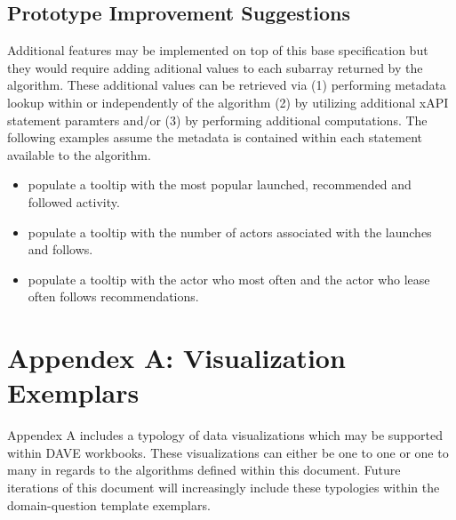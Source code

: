 \documentclass{article}
\begin{document}
\subsection{Prototype Improvement Suggestions}
Additional features may be implemented on top of this base
specification but they would require adding aditional values to each
subarray returned by the algorithm. These additional values can be
retrieved via (1) performing metadata lookup within or independently
of the algorithm (2) by utilizing additional xAPI statement paramters
and/or (3) by performing additional computations. The following
examples assume the metadata is contained within each statement
available to the algorithm.

\begin{itemize}
\item populate a tooltip with the most popular launched, recommended
  and followed activity.
\item populate a tooltip with the number of actors associated with the
  launches and follows.
\item populate a tooltip with the actor who most often and the actor
  who lease often follows recommendations.
\end{itemize}

\section{Appendex A: Visualization Exemplars}
Appendex A includes a typology of data visualizations which may be supported within DAVE workbooks.
These visualizations can either be one to one or one to many in regards to the algorithms defined within this document.
Future iterations of this document will increasingly include these typologies within the domain-question template exemplars.

\begin{figure*}[h]
  \centering
  \begin{floatrow}[3]
    {}
      {}
    \end{floatrow}
\end{figure*}
\end{document}
